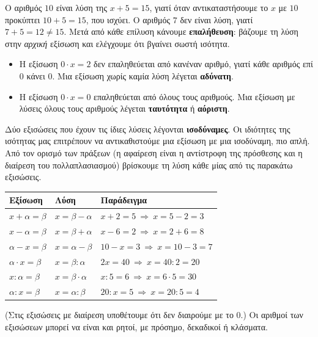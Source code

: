 Ο αριθμός $10$ είναι λύση της $x+5=15$, γιατί όταν αντικαταστήσουμε το $x$ με $10$ προκύπτει $10+5=15$, που ισχύει. Ο αριθμός $7$ δεν είναι λύση, γιατί $7+5=12\neq15$. Μετά από κάθε επίλυση κάνουμε \textbf{επαλήθευση}: βάζουμε τη λύση στην \emph{αρχική} εξίσωση και ελέγχουμε ότι βγαίνει σωστή ισότητα.


\begin{itemize}[leftmargin=1.2em,itemsep=0.3ex,topsep=2pt]
\item Η εξίσωση $0\cdot x=2$ δεν επαληθεύεται από κανέναν αριθμό, γιατί κάθε αριθμός επί $0$ κάνει $0$. Μια εξίσωση χωρίς καμία λύση λέγεται \textbf{αδύνατη}.
\item Η εξίσωση $0\cdot x=0$ επαληθεύεται από όλους τους αριθμούς. Μια εξίσωση με λύσεις όλους τους αριθμούς λέγεται \textbf{ταυτότητα} ή \textbf{αόριστη}.
\end{itemize}


Δύο εξισώσεις που έχουν τις ίδιες λύσεις λέγονται \textbf{ισοδύναμες}. Οι ιδιότητες της ισότητας μας επιτρέπουν να αντικαθιστούμε μια εξίσωση με μια ισοδύναμη, πιο απλή. Από τον ορισμό των πράξεων (η αφαίρεση είναι η αντίστροφη της πρόσθεσης και η διαίρεση του πολλαπλασιασμού) βρίσκουμε τη λύση κάθε μίας από τις παρακάτω εξισώσεις.

\begin{center}
\renewcommand{\arraystretch}{1.5}
\begin{tabular}{@{}lll@{}}
\toprule
\textbf{Εξίσωση} & \textbf{Λύση} & \textbf{Παράδειγμα}\\
\midrule
$x+\alpha=\beta$ & $x=\beta-\alpha$ & $x+2=5\ \Rightarrow\ x=5-2=3$\\
$x-\alpha=\beta$ & $x=\beta+\alpha$ & $x-6=2\ \Rightarrow\ x=2+6=8$\\
$\alpha-x=\beta$ & $x=\alpha-\beta$ & $10-x=3\ \Rightarrow\ x=10-3=7$\\
$\alpha\cdot x=\beta$ & $x=\beta:\alpha$ & $2x=40\ \Rightarrow\ x=40:2=20$\\
$x:\alpha=\beta$ & $x=\beta\cdot\alpha$ & $x:5=6\ \Rightarrow\ x=6\cdot5=30$\\
$\alpha:x=\beta$ & $x=\alpha:\beta$ & $20:x=5\ \Rightarrow\ x=20:5=4$\\
\bottomrule
\end{tabular}
\end{center}

(Στις εξισώσεις με διαίρεση υποθέτουμε ότι δεν διαιρούμε με το $0$.) Οι αριθμοί των εξισώσεων μπορεί να είναι και ρητοί, με πρόσημο, δεκαδικοί ή κλάσματα.

